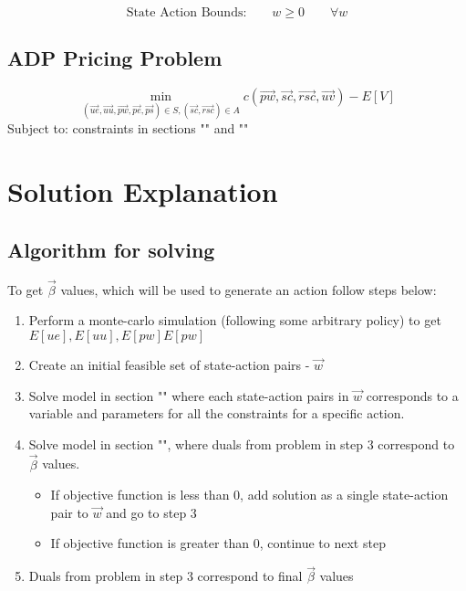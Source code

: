 \documentclass{article}
\begin{document}
\begin{equation}
	\text{State Action Bounds:} \qquad w \ge 0 \qquad \forall w
\end{equation}


\subsection{ADP Pricing Problem}
\label{Pricing Problem}
\begin{equation}
	\min_{(\vec{ue}, \vec{uu}, \vec{pw}, \vec{pe}, \vec{ps}) \in S,  (\vec{sc}, \vec{rsc}) \in A } c(\vec{pw},\vec{sc},\vec{rsc},\vec{uv}) - E[V]
\end{equation}
Subject to:
constraints in sections "" and ""

\section{Solution Explanation}
\subsection{Algorithm for solving}
To get $\vec{\beta}$ values, which will be used to generate an action follow steps below:
\begin{enumerate}
	\item Perform a monte-carlo simulation (following some arbitrary policy) to get $E[ue], E[uu], E[pw] E[pw]$
	\item Create an initial feasible set of state-action pairs - $\vec{w}$
	\item Solve model in section "" where each state-action pairs in $\vec{w}$ corresponds to a variable and parameters for all the constraints for a specific action.
	\item Solve model in section "", where duals from problem in step 3  correspond to $\vec{\beta}$ values. 
		\begin{itemize}
			\item If objective function is less than 0, add solution as a single state-action pair to $\vec{w}$ and go to step 3
			\item If objective function is greater than 0, continue to next step
		\end{itemize}
	\item Duals from problem in step 3 correspond to final $\vec{\beta}$ values
\end{enumerate}
	
\end{document}
